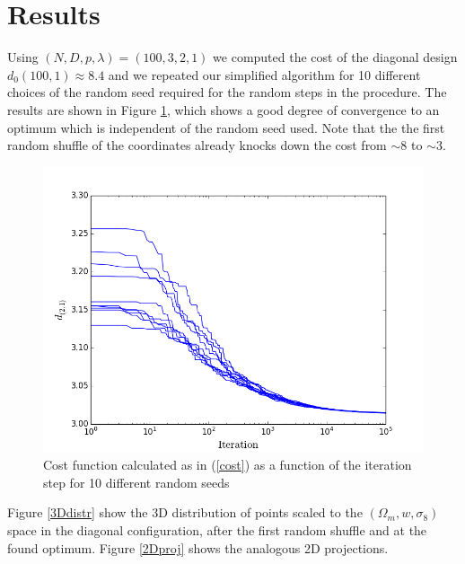 \documentclass[11pt]{article}
\begin{document}
\section*{Results}
Using $(N,D,p,\lambda)=(100,3,2,1)$ we computed the cost of the diagonal design $d_0(100,1)\approx8.4$ and we repeated our simplified algorithm for 10 different choices of the random seed required for the random steps in the procedure. The results are shown in Figure \ref{costfig}, which shows a good degree of convergence to an optimum which is independent of the random seed used. Note that the the first random shuffle of the coordinates already knocks down the cost from $\sim$8 to $\sim$3. 
%
\begin{figure}
\begin{center}
\includegraphics[scale=0.6]{Figures/cost.png}
\end{center}
\caption{Cost function calculated as in (\ref{cost}) as a function of the iteration step for 10 different random seeds}
\label{costfig}
\end{figure}
%
Figure \ref{3Ddistr} show the 3D distribution of points scaled to the $(\Omega_m,w,\sigma_8)$ space in the diagonal configuration, after the first random shuffle and at the found optimum. Figure \ref{2Dproj} shows the analogous 2D projections. 
%
\end{document}
